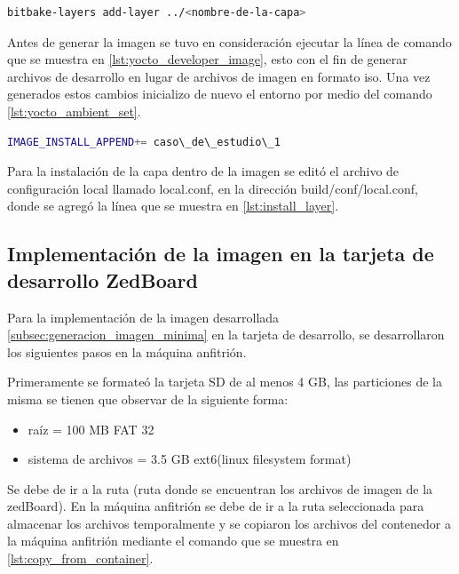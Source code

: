 \begin{lstlisting}[language=bash, caption={Generar archivos de desarrollador, Yocto }, label=lst:yocto_developer_image]
    bitbake-layers add-layer ../<nombre-de-la-capa>
\end{lstlisting}

Antes de generar la imagen se tuvo en consideración ejecutar la línea de comando que se muestra en \ref{lst:yocto_developer_image}, esto con el fin de generar archivos de desarrollo en lugar de archivos de imagen en formato iso. Una vez generados estos cambios inicializo de nuevo el entorno por medio del comando \ref{lst:yocto_ambient_set}. 

\begin{lstlisting}[language=bash, caption={Instalar la capa generada, Yocto }, label=lst:install_layer]
    IMAGE_INSTALL_APPEND+= caso\_de\_estudio\_1
\end{lstlisting}

Para la instalación de la capa dentro de la imagen se editó el archivo de configuración local llamado local.conf, en la dirección build/conf/local.conf, donde se agregó la línea que se muestra en \ref{lst:install_layer}.


\subsection{Implementación de la imagen en la tarjeta de desarrollo ZedBoard}\label{sub:image2zedboard}

Para la implementación de la imagen desarrollada \ref{subsec:generacion_imagen_minima} en la tarjeta de desarrollo, se desarrollaron los siguientes pasos en la máquina anfitrión.

Primeramente se formateó la tarjeta SD de al menos 4 GB, las particiones de la misma se tienen que observar de la siguiente forma:

\begin{itemize}
    \item raíz = 100 MB FAT 32
    \item sistema de archivos = 3.5 GB ext6(linux filesystem format)
\end{itemize} 

Se debe de ir a la ruta (ruta donde se encuentran los archivos de imagen de la zedBoard). En la máquina anfitrión se debe de ir a la ruta seleccionada para almacenar los archivos temporalmente y se copiaron los archivos del contenedor a la máquina anfitrión mediante el comando que se muestra en \ref{lst:copy_from_container}.

